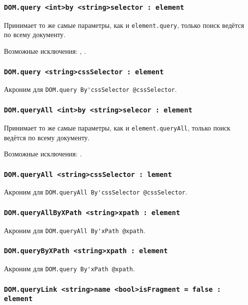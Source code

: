 \subsubsection{\lstinline|DOM.query <int>by <string>selector : element|}

Принимает то же самые параметры, как и \lstinline|element.query|, только поиск ведётся по всему документу.

Возможные исключения: , .

\subsubsection{\lstinline|DOM.query <string>cssSelector : element|}

Акроним для \lstinline|DOM.query By'cssSelector @cssSelector|.

\subsubsection{\lstinline|DOM.queryAll <int>by <string>selecor : element|}

Принимает то же самые параметры, как и \lstinline|element.queryAll|, только поиск ведётся по всему документу.

Возможные исключения: .

\subsubsection{\lstinline|DOM.queryAll <string>cssSelector : lement|}

Акроним для \lstinline|DOM.queryAll By'cssSelector @cssSelector|.

\subsubsection{\lstinline|DOM.queryAllByXPath <string>xpath : element|}

Акроним для \lstinline|DOM.queryAll By'xPath @xpath|.

\subsubsection{\lstinline|DOM.queryByXPath <string>xpath : element|}

Акроним для \lstinline|DOM.query By'xPath @xpath|.

\subsubsection{\lstinline|DOM.queryLink <string>name <bool>isFragment = false : element|}

